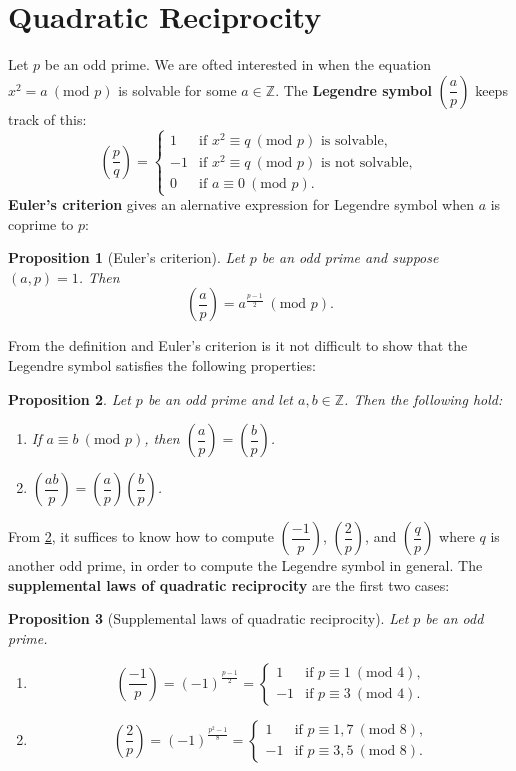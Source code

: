 \documentclass[12pt]{book}
\newtheorem{proposition}{Proposition}[section]
\theoremstyle{definition}\newframedtheorem{method}{Method}
\newcommand{\legendre}[2]{\genfrac{(}{)}{0.5pt}{0}{#1}{#2}}
\newcommand{\tmod}[1]{\ \left(\text{mod }#1\right)}
\newcommand{\Z}{\mathbb{Z}}
\newcommand{\<}{\langle}
\renewcommand{\>}{\rangle}
\begin{document}
  \section{Quadratic Reciprocity}
    Let $p$ be an odd prime. We are ofted interested in when the equation $x^{2} = a \tmod{p}$ is solvable for some $a \in \Z$. The \textbf{Legendre symbol} $\legendre{a}{p}$ keeps track of this:
    \[
      \legendre{p}{q} = \begin{cases} 1 & \text{if $x^{2} \equiv q \tmod{p}$ is solvable}, \\ -1 & \text{if $x^{2} \equiv q \tmod{p}$ is not solvable}, \\ 0 & \text{if $a \equiv 0 \tmod{p}$}. \end{cases}
    \]
    \textbf{Euler's criterion} gives an alernative expression for Legendre symbol when $a$ is coprime to $p$:
    \begin{proposition}[Euler's criterion]
      Let $p$ be an odd prime and suppose $(a,p) = 1$. Then
      \[
        \legendre{a}{p} = a^{\frac{p-1}{2}} \tmod{p}.
      \]
    \end{proposition}
    From the definition and Euler's criterion is it not difficult to show that the Legendre symbol satisfies the following properties:
    \begin{proposition}\label{prop:Legendre_symbol_properties}
      Let $p$ be an odd prime and let $a,b \in \Z$. Then the following hold:
      \begin{enumerate}[label=(\roman*)]
        \item If $a \equiv b \tmod{p}$, then $\legendre{a}{p} = \legendre{b}{p}$.
        \item $\legendre{ab}{p} = \legendre{a}{p}\legendre{b}{p}$.
      \end{enumerate}
    \end{proposition}
    From \cref{prop:Legendre_symbol_properties}, it suffices to know how to compute $\legendre{-1}{p}$, $\legendre{2}{p}$, and $\legendre{q}{p}$ where $q$ is another odd prime, in order to compute the Legendre symbol in general. The \textbf{supplemental laws of quadratic reciprocity} are the first two cases:
    \begin{proposition}[Supplemental laws of quadratic reciprocity]
      Let $p$ be an odd prime.
      \begin{enumerate}[label=(\roman*)]
        \item
        \[
          \legendre{-1}{p} = (-1)^{\frac{p-1}{2}} = \begin{cases} 1 & \text{if $p \equiv 1 \tmod{4}$}, \\ -1 & \text{if $p \equiv 3 \tmod{4}$}. \end{cases}
        \]
        \item
        \[
          \legendre{2}{p} = (-1)^{\frac{p^{2}-1}{8}} = \begin{cases} 1 & \text{if $p \equiv 1,7 \tmod{8}$}, \\ -1 & \text{if $p \equiv 3,5 \tmod{8}$}. \end{cases}
        \]
      \end{enumerate}
    \end{proposition}
\end{document}

